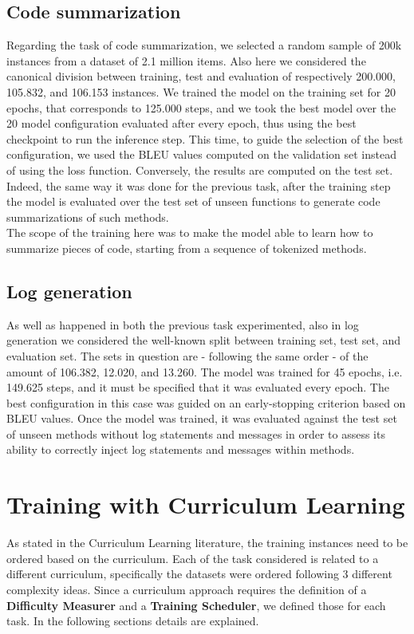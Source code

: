 \subsection{Code summarization}
Regarding the task of code summarization, we selected a random sample of 200k instances from a dataset of 2.1 million items.
Also here we considered the canonical division between training, test and evaluation of respectively 200.000, 105.832, and 106.153 instances.
We trained the model on the training set for 20 epochs, that corresponds to 125.000 steps, and we took the best model over the 20 model configuration evaluated after every epoch,
thus using the best checkpoint to run the inference step. This time, to guide the selection of the best configuration, we used the BLEU values computed on the validation set instead of using
the loss function. Conversely, the results are computed on the test set. Indeed, the same way it was done for the previous task, after the training step the model is
evaluated over the test set of unseen functions to generate code summarizations of such methods.\\
The scope of the training here 
was to make the model able to learn how to summarize pieces of code, starting from a sequence of tokenized methods.

\subsection{Log generation}
As well as happened in both the previous task experimented, also in log generation we considered the well-known split between training set, test set, and evaluation set.
The sets in question are - following the same order - of the amount of 106.382, 12.020, and 13.260. The model was trained for 45 epochs, i.e. 149.625 steps, and 
it must be specified that it was evaluated every epoch. The best configuration in this case was guided on an early-stopping criterion based on BLEU values. 
Once the model was trained, it was evaluated against the test set of unseen methods without log statements and messages in order to assess its ability to correctly inject log statements and messages within methods.
\section{Training with Curriculum Learning}

As stated in the Curriculum Learning literature, the training instances need to be ordered based on the curriculum.
Each of the task considered is related to a different curriculum, specifically the datasets were ordered
following 3 different complexity ideas. Since a curriculum approach requires the definition of a \textbf{Difficulty Measurer}
and a \textbf{Training Scheduler}, we defined those for each task. In the following sections details are explained.

